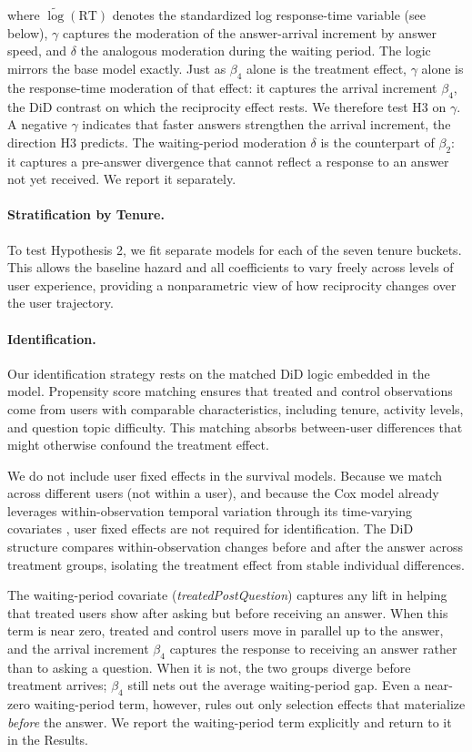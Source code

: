 \noindent where $\widetilde{\log}(\text{RT})$ denotes the standardized log response-time variable (see below), $\gamma$ captures the moderation of the answer-arrival increment by answer speed, and $\delta$ the analogous moderation during the waiting period. The logic mirrors the base model exactly. Just as $\beta_4$ alone is the treatment effect, $\gamma$ alone is the response-time moderation of that effect: it captures the arrival increment $\beta_4$, the DiD contrast on which the reciprocity effect rests. We therefore test H3 on $\gamma$. A negative $\gamma$ indicates that faster answers strengthen the arrival increment, the direction H3 predicts. The waiting-period moderation $\delta$ is the counterpart of $\beta_2$: it captures a pre-answer divergence that cannot reflect a response to an answer not yet received. We report it separately.

\paragraph{Stratification by Tenure.} To test Hypothesis 2, we fit separate models for each of the seven tenure buckets. This allows the baseline hazard and all coefficients to vary freely across levels of user experience, providing a nonparametric view of how reciprocity changes over the user trajectory.

\paragraph{Identification.} Our identification strategy rests on the matched DiD logic embedded in the model. Propensity score matching \citep{rosenbaum_rubin_1983} ensures that treated and control observations come from users with comparable characteristics, including tenure, activity levels, and question topic difficulty. This matching absorbs between-user differences that might otherwise confound the treatment effect.

We do not include user fixed effects in the survival models. Because we match across different users (not within a user), and because the Cox model already leverages within-observation temporal variation through its time-varying covariates \citep{andersen_gill_1982}, user fixed effects are not required for identification. The DiD structure compares within-observation changes before and after the answer across treatment groups, isolating the treatment effect from stable individual differences.

The waiting-period covariate (\textit{treatedPostQuestion}) captures any lift in helping that treated users show after asking but before receiving an answer. When this term is near zero, treated and control users move in parallel up to the answer, and the arrival increment $\beta_4$ captures the response to receiving an answer rather than to asking a question. When it is not, the two groups diverge before treatment arrives; $\beta_4$ still nets out the average waiting-period gap. Even a near-zero waiting-period term, however, rules out only selection effects that materialize \textit{before} the answer. We report the waiting-period term explicitly and return to it in the Results.

